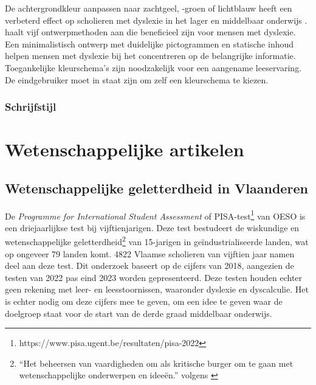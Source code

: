 De achtergrondkleur aanpassen naar zachtgeel, -groen of lichtblauw heeft een verbeterd effect op scholieren met dyslexie in het lager en middelbaar onderwijs \autocite{Bezem2016, Rello2017}. \textcite{Anthony2020} haalt vijf ontwerpmethoden aan die beneficieel zijn voor mensen met dyslexie. Een minimalistisch ontwerp met duidelijke pictogrammen en statische inhoud helpen mensen met dyslexie bij het concentreren op de belangrijke informatie. Toegankelijke kleurschema's zijn noodzakelijk voor een aangename leeservaring. De eindgebruiker moet in staat zijn om zelf een kleurschema te kiezen.

\subsubsection{Schrijfstijl}


\section{Wetenschappelijke artikelen}

\subsection{Wetenschappelijke geletterdheid in Vlaanderen}

De \textit{Programme for International Student Assessment} of PISA-test\footnote{https://www.pisa.ugent.be/resultaten/pisa-2022} van OESO is een driejaarlijkse test bij vijftienjarigen. Deze test bestudeert de wiskundige en wetenschappelijke geletterdheid\footnote{“Het beheersen van vaardigheden om als kritische burger om te gaan met wetenschappelijke onderwerpen en ideeën.” volgens \textcite{DeMeyer2019}} van 15-jarigen in geïndustrialiseerde landen, wat op ongeveer 79 landen komt. 4822 Vlaamse scholieren van vijftien jaar namen deel aan deze test. Dit onderzoek baseert op de cijfers van 2018, aangezien de testen van 2022 pas eind 2023 worden gepresenteerd. Deze testen houden echter geen rekening met leer- en leesstoornissen, waaronder dyslexie en dyscalculie. Het is echter nodig om deze cijfers mee te geven, om een idee te geven waar de doelgroep staat voor de start van de derde graad middelbaar onderwijs. 

